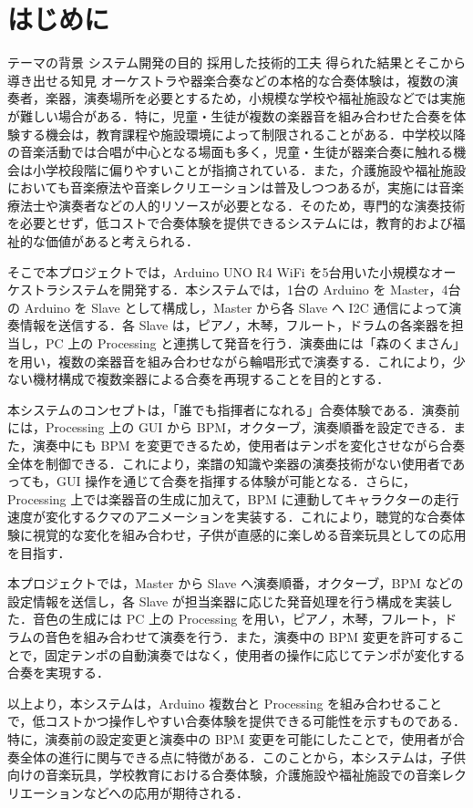 \section{はじめに}
 テーマの背景
 システム開発の目的
 採用した技術的工夫
 得られた結果とそこから導き出せる知見
\fi
オーケストラや器楽合奏などの本格的な合奏体験は，複数の演奏者，楽器，演奏場所を必要とするため，小規模な学校や福祉施設などでは実施が難しい場合がある．特に，児童・生徒が複数の楽器音を組み合わせた合奏を体験する機会は，教育課程や施設環境によって制限されることがある．中学校以降の音楽活動では合唱が中心となる場面も多く，児童・生徒が器楽合奏に触れる機会は小学校段階に偏りやすいことが指摘されている\cite{hira2018}．また，介護施設や福祉施設においても音楽療法や音楽レクリエーションは普及しつつあるが，実施には音楽療法士や演奏者などの人的リソースが必要となる\cite{carelitz_musictherapy}．そのため，専門的な演奏技術を必要とせず，低コストで合奏体験を提供できるシステムには，教育的および福祉的な価値があると考えられる．

そこで本プロジェクトでは，Arduino UNO R4 WiFi を5台用いた小規模なオーケストラシステムを開発する．本システムでは，1台の Arduino を Master，4台の Arduino を Slave として構成し，Master から各 Slave へ I2C 通信によって演奏情報を送信する．各 Slave は，ピアノ，木琴，フルート，ドラムの各楽器を担当し，PC 上の Processing と連携して発音を行う．演奏曲には「森のくまさん」を用い，複数の楽器音を組み合わせながら輪唱形式で演奏する．これにより，少ない機材構成で複数楽器による合奏を再現することを目的とする．

本システムのコンセプトは，「誰でも指揮者になれる」合奏体験である．演奏前には，Processing 上の GUI から BPM，オクターブ，演奏順番を設定できる．また，演奏中にも BPM を変更できるため，使用者はテンポを変化させながら合奏全体を制御できる．これにより，楽譜の知識や楽器の演奏技術がない使用者であっても，GUI 操作を通じて合奏を指揮する体験が可能となる．さらに，Processing 上では楽器音の生成に加えて，BPM に連動してキャラクターの走行速度が変化するクマのアニメーションを実装する．これにより，聴覚的な合奏体験に視覚的な変化を組み合わせ，子供が直感的に楽しめる音楽玩具としての応用を目指す．

本プロジェクトでは，Master から Slave へ演奏順番，オクターブ，BPM などの設定情報を送信し，各 Slave が担当楽器に応じた発音処理を行う構成を実装した．音色の生成には PC 上の Processing を用い，ピアノ，木琴，フルート，ドラムの音色を組み合わせて演奏を行う．また，演奏中の BPM 変更を許可することで，固定テンポの自動演奏ではなく，使用者の操作に応じてテンポが変化する合奏を実現する．

以上より，本システムは，Arduino 複数台と Processing を組み合わせることで，低コストかつ操作しやすい合奏体験を提供できる可能性を示すものである．特に，演奏前の設定変更と演奏中の BPM 変更を可能にしたことで，使用者が合奏全体の進行に関与できる点に特徴がある．このことから，本システムは，子供向けの音楽玩具，学校教育における合奏体験，介護施設や福祉施設での音楽レクリエーションなどへの応用が期待される．
